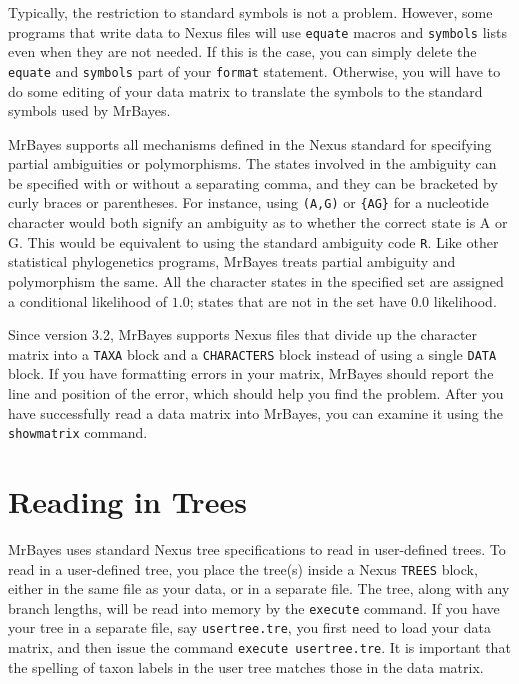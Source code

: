 \documentclass[12pt]{book}
\newcommand{\ttt}[1]{\texttt{#1}}
\begin{document}
Typically, the restriction to standard symbols is not a problem. However, some programs that write
data to Nexus files will use \ttt{equate} macros and \ttt{symbols} lists even when they are not
needed. If this is the case, you can simply delete the \ttt{equate} and \ttt{symbols} part of your
\ttt{format} statement. Otherwise, you will have to do some editing of your data matrix to
translate the symbols to the standard symbols used by MrBayes.

MrBayes supports all mechanisms defined in the Nexus standard for specifying partial ambiguities or
polymorphisms. The states involved in the ambiguity can be specified with or without a separating
comma, and they can be bracketed by curly braces or parentheses. For instance, using \ttt{(A,G)} or
\ttt{\{AG\}} for a nucleotide character would both signify an ambiguity as to whether the correct
state is A or G. This would be equivalent to using the standard ambiguity code \ttt{R}. Like other
statistical phylogenetics programs, MrBayes treats partial ambiguity and polymorphism the same. All
the character states in the specified set are assigned a conditional likelihood of $1.0$; states
that are not in the set have $0.0$ likelihood.

Since version 3.2, MrBayes supports Nexus files that divide up the character matrix into a
\ttt{TAXA} block and a \ttt{CHARACTERS} block instead of using a single \ttt{DATA} block. If you
have formatting errors in your matrix, MrBayes should report the line and position of the error,
which should help you find the problem. After you have successfully read a data matrix into
MrBayes, you can examine it using the \ttt{showmatrix} command.

\section{Reading in Trees}

MrBayes uses standard Nexus tree specifications to read in user-defined trees. To read in a
user-defined tree, you place the tree(s) inside a Nexus \ttt{TREES} block, either in the same file
as your data, or in a separate file. The tree, along with any branch lengths, will be read into
memory by the \ttt{execute} command. If you have your tree in a separate file, say
\ttt{usertree.tre}, you first need to load your data matrix, and then issue the command
\ttt{execute usertree.tre}. It is important that the spelling of taxon labels in the user tree
matches those in the data matrix. 
\end{document}
